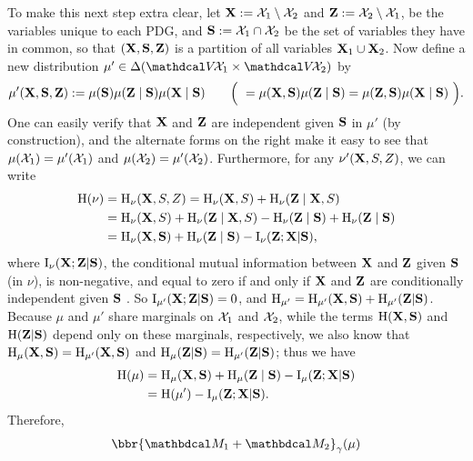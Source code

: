 \begin{subappendices}
\begin{lproof}
    To make this next step extra clear, let $\mathbf X := \mathcal X_1 \setminus \mathcal X_2$ and
    $\mathbf Z := \mathcal X_2 \setminus \mathcal X_1$, be the variables unique to each PDG, and $\mathbf S:= \mathcal X_1 \cap \mathcal X_2$ be the set of variables they have in common, so that $(\mathbf X, \mathbf S, \mathbf Z)$ is a partition of all variables $\mathbf X_1 \cup \mathbf X_2$.
    Now define a new distribution $\mu' \in \Delta(\V\!\X_1 \times \V\!\X_2)$ by
    \[
        \bf
        \mu'( X,  S,  Z)
            := \mu(S) \mu( Z \mid  S)\mu( X \mid  S)
            \qquad \Big(~
            = \mu( X,  S) \mu( Z \mid  S)
            = \mu( Z,  S) \mu( X \mid  S)~\Big).
    \]
    One can easily verify that $\mathbf X$ and $\mathbf Z$ are independent given $\mathbf S$ in $\mu'$ (by construction), and the alternate forms on the right make it easy to see that $\mu(\mathcal X_1) = \mu'(\mathcal X_1)$ and $\mu(\mathcal X_2) = \mu'(\mathcal X_2)$.
    Furthermore, for any $\nu'(\mathbf X,S,Z)$, we can write
    \begin{align*}
        \operatorname{\mathrm{H}}( \nu ) &=  \operatorname{\mathrm{H}}_\nu(\mathbf X,S,Z) =
            \operatorname{\mathrm{H}}_\nu(\mathbf X,S) + \operatorname{\mathrm{H}}_\nu(\mathbf Z \mid \mathbf X,S) \\
            &= \operatorname{\mathrm{H}}_\nu(\mathbf X,S) + \operatorname{\mathrm{H}}_\nu(\mathbf Z \mid \mathbf X,S) - \operatorname{\mathrm{H}}_\nu(\mathbf Z \mid \mathbf S) + \operatorname{\mathrm{H}}_\nu(\mathbf Z \mid \mathbf S) \\
            &= \operatorname{\mathrm{H}}_\nu(\mathbf X,\mathbf S) + \operatorname{\mathrm{H}}_\nu(\mathbf Z \mid \mathbf S) - \operatorname{\mathrm{I}}_\nu(\mathbf Z; \mathbf X| \mathbf S),
    \end{align*}
    where $\operatorname{\mathrm{I}}_\nu(\bf X;Z|S)$, the conditional mutual information between $\mathbf X$ and $\mathbf Z$ given $\mathbf S$ (in $\nu$), is non-negative, and equal to zero if and only if $\mathbf X$ and $\mathbf Z$ are conditionally independent given $\mathbf S$ \parencite[see, for instance,][\S1]{mackay2003information}.
    So $\operatorname{\mathrm{I}}_{\mu'}(\mathbf X; \mathbf Z| \mathbf S) = 0$, and
        $\operatorname{\mathrm{H}}_{\mu'} = \operatorname{\mathrm{H}}_{\mu'}(\mathbf X, \mathbf S) + \operatorname{\mathrm{H}}_{\mu'}(\mathbf Z| \mathbf S)$.
    Because $\mu$ and $\mu'$ share marginals on $\mathcal X_1$ and $\mathcal X_2$, while the terms $\operatorname{\mathrm{H}}(\mathbf X, \mathbf S)$ and $\operatorname{\mathrm{H}}(\mathbf Z|\mathbf S)$ depend only on these marginals, respectively, we also know that $\operatorname{\mathrm{H}}_{\mu}(\mathbf X, \mathbf S) = \operatorname{\mathrm{H}}_{\mu'}(\mathbf X, \mathbf S)$ and $\operatorname{\mathrm{H}}_{\mu}(\mathbf Z | \mathbf S) = \operatorname{\mathrm{H}}_{\mu'}(\mathbf Z| \mathbf S)$; thus we have
    \begin{align*}
        \operatorname{\mathrm{H}}(\mu) &= \operatorname{\mathrm{H}}_\mu(\mathbf X,\mathbf S) + \operatorname{\mathrm{H}}_\mu(\mathbf Z \mid \mathbf S) - \operatorname{\mathrm{I}}_\mu(\mathbf Z; \mathbf X| \mathbf S) \\
            &= \operatorname{\mathrm{H}}(\mu') - \operatorname{\mathrm{I}}_\mu(\mathbf Z; \mathbf X| \mathbf S).
    \end{align*}
    Therefore,
    \begin{align*}
        \bbr{\dg M_1 \bundle \dg M_2}_\gamma(\mu)

\end{align*}
\end{lproof}
\end{subappendices}
